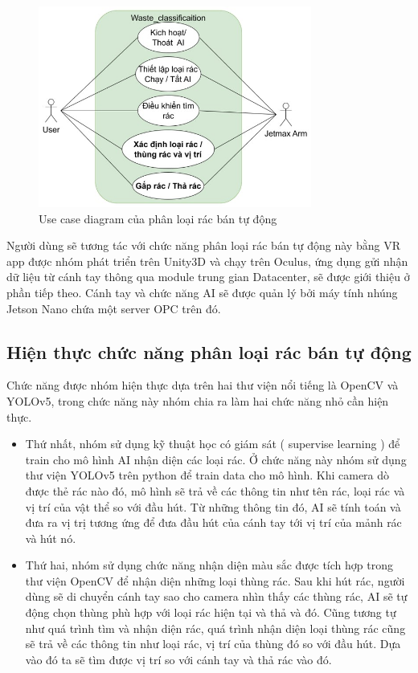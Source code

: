     \begin{figure}[!h]
        \centering
        \includegraphics[width=0.8\textwidth]{Images/Implementation/AI/waste_usecase.jpg}
        \caption{Use case diagram của phân loại rác bán tự động}
    \end{figure}



Người dùng sẽ tương tác với chức năng phân loại rác bán tự động này bằng VR app được nhóm phát triển trên Unity3D và chạy trên Oculus, ứng dụng gửi nhận dữ liệu từ cánh tay thông qua module trung gian Datacenter, sẽ được giới thiệu ở phần tiếp theo. Cánh tay và chức năng AI sẽ được quản lý bởi máy tính nhúng Jetson Nano chứa một server OPC trên đó.
\subsection{Hiện thực chức năng phân loại rác bán tự động}
Chức năng được nhóm hiện thực dựa trên hai thư viện nổi tiếng là OpenCV và YOLOv5, trong chức năng này nhóm chia ra làm hai chức năng nhỏ cần hiện thực.

\begin{itemize}
    \item Thứ nhất, nhóm sử dụng kỹ thuật học có giám sát ( supervise learning ) để train cho mô hình AI nhận diện các loại rác. Ở chức năng này nhóm sử dụng thư viện YOLOv5 trên python để train data cho mô hình. Khi camera dò được thẻ rác nào đó, mô hình sẽ trả về các thông tin như tên rác, loại rác và vị trí của vật thể so với đầu hút. Từ những thông tin đó, AI sẽ tính toán và đưa ra vị trị tương ứng để đưa đầu hút của cánh tay tới vị trí của mảnh rác và hút nó.
    \item Thứ hai, nhóm sử dụng chức năng nhận diện màu sắc được tích hợp trong thư viện OpenCV để nhận diện những loại thùng rác. Sau khi hút rác, người dùng sẽ di chuyển cánh tay sao cho camera nhìn thấy các thùng rác, AI sẽ tự động chọn thùng phù hợp với loại rác hiện tại và thả và đó. Cũng tương tự như quá trình tìm và nhận diện rác, quá trình nhận diện loại thùng rác cũng sẽ trả về các thông tin như loại rác, vị trí của thùng đó so với đầu hút. Dựa vào đó ta sẽ tìm được vị trí so với cánh tay và thả rác vào đó.
\end{itemize}

